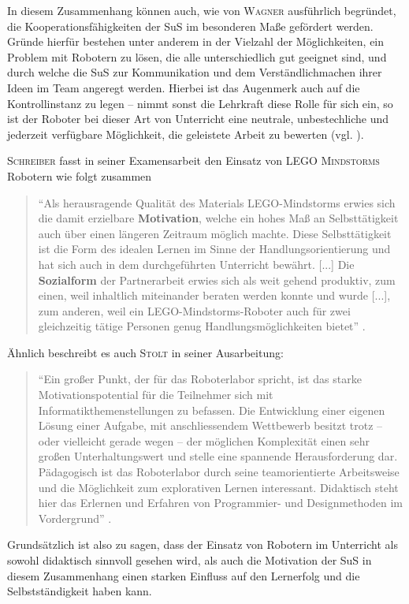 \documentclass[paper=a4, DIV=calc, BCOR=12mm, twoside=on, onecolumn=on, open = right, titlepage =on, parskip =half-, headsepline = on, footsepline = off, chapterprefix = off, appendixprefix = on, fontsize = 12pt, numbers = noenddot, abstract = on]{scrbook}
\begin{document}
In diesem Zusammenhang können auch, wie von \textsc{Wagner} ausführlich begründet, die Kooperationsfähigkeiten der SuS im besonderen Maße gefördert werden. Gründe hierfür bestehen unter anderem in der Vielzahl der Möglichkeiten, ein Problem mit Robotern zu lösen, die alle unterschiedlich gut geeignet sind, und durch welche die SuS zur Kommunikation und dem Verständlichmachen ihrer Ideen im Team angeregt werden. Hierbei ist das Augenmerk auch auf die Kontrollinstanz zu legen -- nimmt sonst die Lehrkraft diese Rolle für sich ein, so ist der Roboter bei dieser Art von Unterricht eine neutrale, unbestechliche und jederzeit verfügbare Möglichkeit, die geleistete Arbeit zu bewerten (vgl. \cite[S.6f.]{wagner:05}).

\textsc{Schreiber} fasst in seiner Examensarbeit den Einsatz von \textsc{LEGO Mindstorms} Robotern wie folgt zusammen
\begin{quote}
"`Als herausragende Qualität des Materials LEGO-Mindstorms erwies sich die damit erzielbare \textbf{Motivation}, welche ein hohes Maß an Selbsttätigkeit auch über einen längeren Zeitraum möglich machte. Diese Selbsttätigkeit ist die Form des idealen Lernen im Sinne der Handlungsorientierung und hat sich auch in dem durchgeführten Unterricht bewährt. [...] Die \textbf{Sozialform} der Partnerarbeit erwies sich als weit gehend produktiv, zum einen, weil inhaltlich miteinander beraten werden konnte und wurde [...], zum anderen, weil ein LEGO-Mindstorms-Roboter auch für zwei gleichzeitig tätige Personen genug Handlungsmöglichkeiten bietet"' \cite[S.47f.]{schreiber:04}.
\end{quote}

Ähnlich beschreibt es auch \textsc{Stolt} in seiner Ausarbeitung:
\begin{quote}
"`Ein großer Punkt, der für das Roboterlabor spricht, ist das starke Motivationspotential für die Teilnehmer sich mit Informatikthemenstellungen zu befassen. Die Entwicklung einer eigenen Lösung einer Aufgabe, mit anschliessendem Wettbewerb besitzt trotz – oder vielleicht gerade wegen – der möglichen Komplexität einen sehr großen Unterhaltungswert und stelle eine spannende Herausforderung dar. Pädagogisch ist das Roboterlabor durch seine teamorientierte Arbeitsweise und die Möglichkeit zum explorativen Lernen interessant. Didaktisch steht hier das Erlernen und Erfahren von Programmier- und Designmethoden im Vordergrund"' \cite[S.5f.]{stolt:01}.
\end{quote}

Grundsätzlich ist also zu sagen, dass der Einsatz von Robotern im Unterricht als sowohl didaktisch sinnvoll gesehen wird, als auch die Motivation der SuS in diesem Zusammenhang einen starken Einfluss auf den Lernerfolg und die Selbstständigkeit haben kann. 
\end{document}
